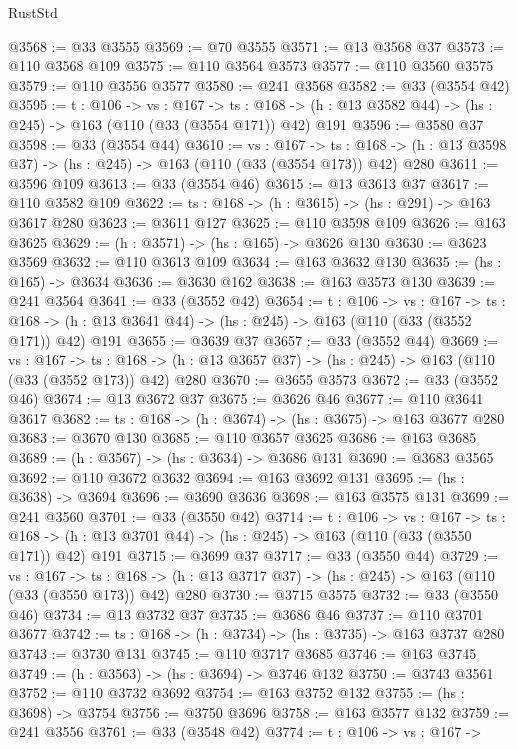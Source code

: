 \begin{lexlean}{RustStd}
\begin{coremodule}
@3568 := @33 @3555
@3569 := @70 @3555
@3571 := @13 @3568 @37
@3573 := @110 @3568 @109
@3575 := @110 @3564 @3573
@3577 := @110 @3560 @3575
@3579 := @110 @3556 @3577
@3580 := @241 @3568
@3582 := @33 (@3554 @42)
@3595 := {t : @106} ->
  {vs : @167} ->
  {ts : @168} -> (h : @13 @3582 @44) -> (hs : @245) -> @163 (@110 (@33 (@3554 @171)) @42) @191
@3596 := @3580 @37
@3598 := @33 (@3554 @44)
@3610 := {vs : @167} ->
  {ts : @168} -> (h : @13 @3598 @37) -> (hs : @245) -> @163 (@110 (@33 (@3554 @173)) @42) @280
@3611 := @3596 @109
@3613 := @33 (@3554 @46)
@3615 := @13 @3613 @37
@3617 := @110 @3582 @109
@3622 := {ts : @168} -> (h : @3615) -> (hs : @291) -> @163 @3617 @280
@3623 := @3611 @127
@3625 := @110 @3598 @109
@3626 := @163 @3625
@3629 := (h : @3571) -> (hs : @165) -> @3626 @130
@3630 := @3623 @3569
@3632 := @110 @3613 @109
@3634 := @163 @3632 @130
@3635 := (hs : @165) -> @3634
@3636 := @3630 @162
@3638 := @163 @3573 @130
@3639 := @241 @3564
@3641 := @33 (@3552 @42)
@3654 := {t : @106} ->
  {vs : @167} ->
  {ts : @168} -> (h : @13 @3641 @44) -> (hs : @245) -> @163 (@110 (@33 (@3552 @171)) @42) @191
@3655 := @3639 @37
@3657 := @33 (@3552 @44)
@3669 := {vs : @167} ->
  {ts : @168} -> (h : @13 @3657 @37) -> (hs : @245) -> @163 (@110 (@33 (@3552 @173)) @42) @280
@3670 := @3655 @3573
@3672 := @33 (@3552 @46)
@3674 := @13 @3672 @37
@3675 := @3626 @46
@3677 := @110 @3641 @3617
@3682 := {ts : @168} -> (h : @3674) -> (hs : @3675) -> @163 @3677 @280
@3683 := @3670 @130
@3685 := @110 @3657 @3625
@3686 := @163 @3685
@3689 := (h : @3567) -> (hs : @3634) -> @3686 @131
@3690 := @3683 @3565
@3692 := @110 @3672 @3632
@3694 := @163 @3692 @131
@3695 := (hs : @3638) -> @3694
@3696 := @3690 @3636
@3698 := @163 @3575 @131
@3699 := @241 @3560
@3701 := @33 (@3550 @42)
@3714 := {t : @106} ->
  {vs : @167} ->
  {ts : @168} -> (h : @13 @3701 @44) -> (hs : @245) -> @163 (@110 (@33 (@3550 @171)) @42) @191
@3715 := @3699 @37
@3717 := @33 (@3550 @44)
@3729 := {vs : @167} ->
  {ts : @168} -> (h : @13 @3717 @37) -> (hs : @245) -> @163 (@110 (@33 (@3550 @173)) @42) @280
@3730 := @3715 @3575
@3732 := @33 (@3550 @46)
@3734 := @13 @3732 @37
@3735 := @3686 @46
@3737 := @110 @3701 @3677
@3742 := {ts : @168} -> (h : @3734) -> (hs : @3735) -> @163 @3737 @280
@3743 := @3730 @131
@3745 := @110 @3717 @3685
@3746 := @163 @3745
@3749 := (h : @3563) -> (hs : @3694) -> @3746 @132
@3750 := @3743 @3561
@3752 := @110 @3732 @3692
@3754 := @163 @3752 @132
@3755 := (hs : @3698) -> @3754
@3756 := @3750 @3696
@3758 := @163 @3577 @132
@3759 := @241 @3556
@3761 := @33 (@3548 @42)
@3774 := {t : @106} ->
  {vs : @167} ->

\end{coremodule}
\end{lexlean}
